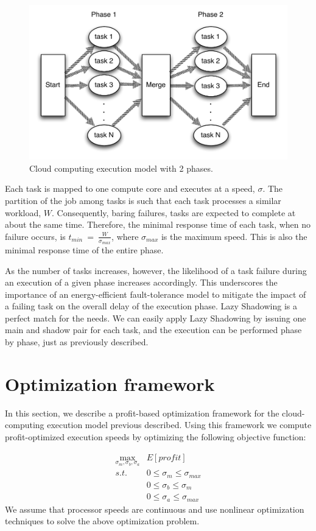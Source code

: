\begin{figure}[!h]
	\begin{center}
		\includegraphics[width=0.6\columnwidth]{figures/system_model_1.pdf}
	\end{center}
	\caption{Cloud computing execution model with 2 phases.}
	\label{fig:system_model}
\end{figure} 

Each task is mapped to one compute core and executes at a speed, $\sigma$. The partition of the job among tasks is
such that each task processes a similar
workload, $W$. Consequently, baring failures, tasks are expected to
complete at about the same time. Therefore, the minimal response time
of each task, when no failure occurs, is
$t_{min}~=~\frac{W}{\sigma_{max}}$, where $\sigma_{max}$ is the maximum speed. This is also the minimal response
time of the entire phase. 

As the number of tasks increases, however, the likelihood of a task
failure during an execution of a given phase increases
accordingly. This underscores the importance of an energy-efficient
fault-tolerance model to mitigate the impact of a failing task on the
overall delay of the execution phase. Lazy Shadowing is a perfect match for the needs. We can easily apply 
Lazy Shadowing by issuing one main and shadow pair for each task, and the execution can be performed phase 
by phase, just as previously described. 

\section{Optimization framework}

In this section, we describe a profit-based optimization framework for
the cloud-computing execution model previous described. Using this
framework we compute profit-optimized execution speeds by
optimizing the following objective function:


\begin{equation}
\label{optimization_problem}
\begin{alignedat}{2}
\max_{\sigma_m,\sigma_b,\sigma_a}     & E[profit] \\
s.t.                                 & 0 \leq \sigma_m \leq \sigma_{max} \\
                                     & 0 \leq \sigma_b \leq \sigma_{m} \\
                                     & 0 \leq \sigma_a \leq \sigma_{max} 
\end{alignedat}
\end{equation}
We assume that processor
speeds are continuous and use nonlinear optimization techniques
to solve the above optimization problem. 

